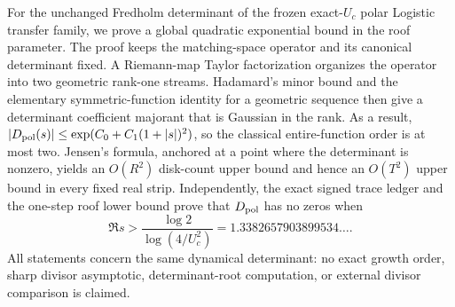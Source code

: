 For the unchanged Fredholm determinant of the frozen exact-\(U_c\) polar
Logistic transfer family, we prove a global quadratic exponential bound in
the roof parameter. The proof keeps the matching-space operator and its
canonical determinant fixed. A Riemann-map Taylor factorization organizes
the operator into two geometric rank-one streams. Hadamard's minor bound and
the elementary symmetric-function identity for a geometric sequence then
give a determinant coefficient majorant that is Gaussian in the rank. As a
result,
\(
 |D_{\mathrm{pol}}(s)|\le
 \exp(C_0+C_1(1+|s|)^2)
\),
so the classical entire-function order is at most two. Jensen's formula,
anchored at a point where the determinant is nonzero, yields an
\(O(R^2)\) disk-count upper bound and hence an \(O(T^2)\) upper bound in
every fixed real strip. Independently, the exact signed trace ledger and the
one-step roof lower bound prove that \(D_{\mathrm{pol}}\) has no zeros when
\[
 \Re s>\frac{\log 2}{\log(4/U_c^2)}
 =1.3382657903899534\ldots.
\]
All statements concern the same dynamical determinant: no exact growth
order, sharp divisor asymptotic, determinant-root computation, or external
divisor comparison is claimed.
